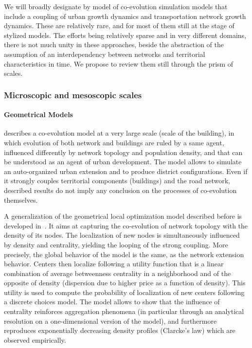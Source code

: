 \documentclass[galley]{jtlu-article-2col}
\begin{document}
We will broadly designate by model of co-evolution simulation models that include a coupling of urban growth dynamics and transportation network growth dynamics. These are relatively rare, and for most of them still at the stage of stylized models. The efforts being relatively sparse and in very different domains, there is not much unity in these approaches, beside the abstraction of the assumption of an interdependency between networks and territorial characteristics in time. We propose to review them still through the prism of scales.


\subsubsection{Microscopic and mesoscopic scales}


\paragraph{Geometrical Models}

\cite{achibet2014model} describes a co-evolution model at a very large scale (scale of the building), in which evolution of both network and buildings are ruled by a same agent, influenced differently by network topology and population density, and that can be understood as an agent of urban development. The model allows to simulate an auto-organized urban extension and to produce district configurations. Even if it strongly couples territorial components (buildings) and the road network, described results do not imply any conclusion on the processes of co-evolution themselves.

A generalization of the geometrical local optimization model described before is developed in~\cite{barthelemy2009co}. It aims at capturing the co-evolution of network topology with the density of its nodes. The localization of new nodes is simultaneously influenced by density and centrality, yielding the looping of the strong coupling. More precisely, the global behavior of the model is the same, as the network extension behavior. Centers then localize following a utility function that is a linear combination of average betweenness centrality in a neighborhood and of the opposite of density (dispersion due to higher price as a function of density). This utility is used to compute the probability of localization of new centers following a discrete choices model. The model allows to show that the influence of centrality reinforces aggregation phenomena (in particular through an analytical resolution on a one-dimensional version of the model), and furthermore reproduces exponentially decreasing density profiles (Clarcke's law) which are observed empirically. 
\end{document}
